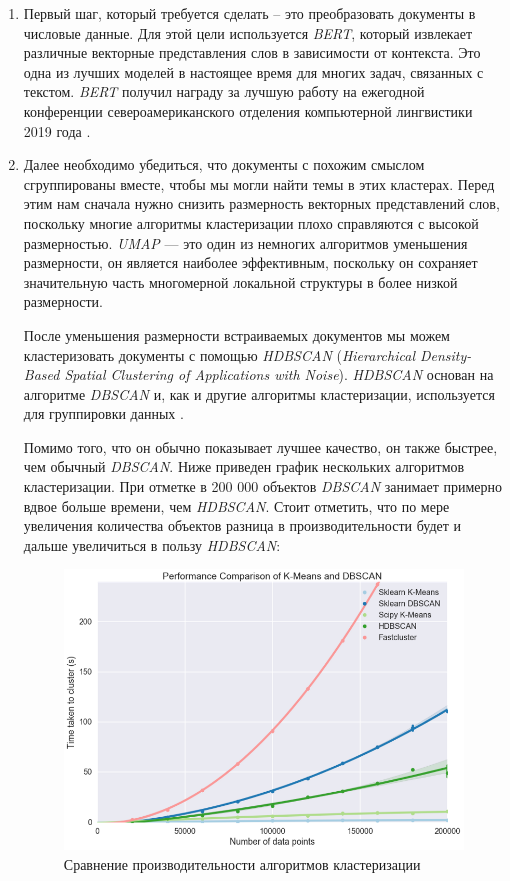 \begin{enumerate}

\item Первый шаг, который требуется сделать -- это преобразовать документы в числовые данные. Для этой цели используется \textit{BERT}, который извлекает различные векторные представления слов в зависимости от контекста. Это одна из лучших моделей в настоящее время для многих задач, связанных с текстом. \textit{BERT} получил награду за лучшую работу на ежегодной конференции североамериканского отделения  компьютерной лингвистики 2019 года \cite{bib_1} \cite{bib_2}.

\item Далее необходимо убедиться, что документы с похожим смыслом сгруппированы вместе, чтобы мы могли найти темы в этих кластерах. Перед этим нам сначала нужно снизить размерность векторных представлений слов, поскольку многие алгоритмы кластеризации плохо справляются с высокой размерностью. 
\textit{UMAP} --- это один из немногих алгоритмов уменьшения размерности, он является наиболее эффективным,
 поскольку он сохраняет значительную часть многомерной локальной структуры в более низкой размерности. 


После уменьшения размерности встраиваемых документов  мы можем кластеризовать документы с помощью \textit{HDBSCAN} (\textit{Hierarchical Density-Based Spatial Clustering of Applications with Noise}).
\textit{HDBSCAN} основан на алгоритме \textit{DBSCAN} и, как и другие алгоритмы кластеризации, используется для группировки данных \cite{bib_3}.

Помимо того, что он обычно показывает лучшее качество, он также быстрее, чем обычный 
\textit{DBSCAN}. Ниже приведен график нескольких алгоритмов кластеризации. При отметке в 200 000 объектов \textit{DBSCAN} занимает примерно вдвое больше времени, чем 
\textit{HDBSCAN}. Стоит отметить, что по мере увеличения количества объектов разница в производительности будет и дальше увеличиться в пользу \textit{HDBSCAN}:
\newline

\begin{figure}[H]
\centering
\includegraphics[scale=0.5]{pics/clustering-comparison.png}
\caption{Сравнение производительности алгоритмов кластеризации}
\end{figure}


\end{enumerate}
